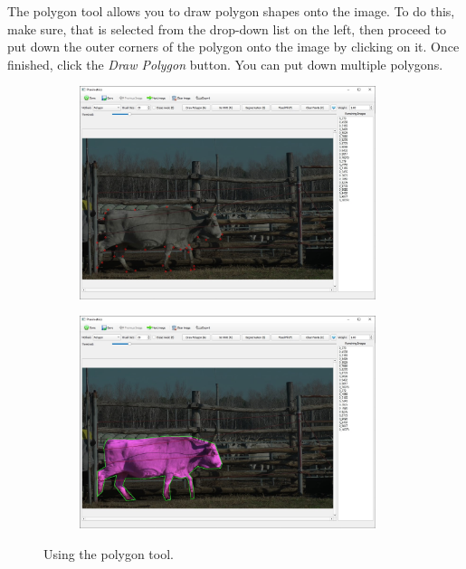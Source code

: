 \documentclass[10pt,a4paper,oneside]{report}             %
\begin{document}
The polygon tool allows you to draw polygon shapes onto the image. To do this, make sure, that  is selected from the drop-down list on the left, then proceed to put down the outer corners of the polygon onto the image by clicking on it. Once finished, click the \textit{Draw Polygon} button. You can put down multiple polygons.


\begin{figure}[H]
	\centering
	\begin{subfigure}{\textwidth}
		\centering 
		\includegraphics[width=0.95\textwidth]{./images/PlaniPoly1.jpg}
	\end{subfigure}
	\begin{subfigure}{\textwidth}
	\centering 
	\includegraphics[width=0.95\textwidth]{./images/PlaniPoly2.jpg}
	\end{subfigure}
	\caption[]
	{\small  Using the polygon tool.}
\end{figure} 
\end{document}
